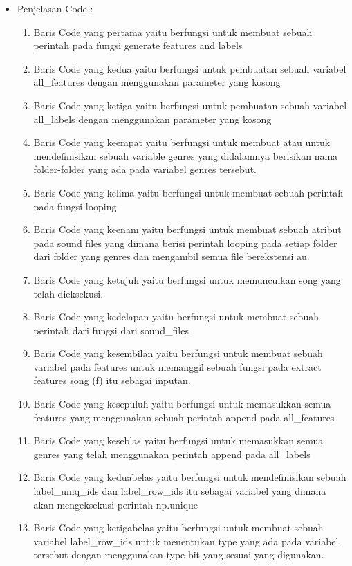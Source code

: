 \begin{enumerate}
\begin{itemize}
\par
\par
\item Penjelasan Code :
\begin{enumerate}
\item Baris Code yang pertama yaitu berfungsi untuk membuat sebuah perintah pada fungsi generate features and labels
\item Baris Code yang kedua yaitu berfungsi untuk pembuatan sebuah variabel all\_features dengan menggunakan parameter yang kosong
\item Baris Code yang ketiga yaitu berfungsi untuk pembuatan sebuah variabel all\_labels dengan menggunakan parameter yang kosong
\item Baris Code yang keempat yaitu berfungsi untuk membuat atau untuk mendefinisikan sebuah variable genres yang didalamnya berisikan nama folder-folder yang ada pada variabel genres tersebut.
\item Baris Code yang kelima yaitu berfungsi untuk membuat sebuah perintah pada fungsi looping
\item Baris Code yang keenam yaitu berfungsi untuk membuat sebuah atribut pada sound files yang dimana berisi perintah looping pada setiap folder dari folder yang genres dan mengambil semua file berekstensi au.
\item Baris Code yang ketujuh yaitu berfungsi untuk memunculkan song yang telah dieksekusi.
\item Baris Code yang kedelapan yaitu berfungsi untuk membuat sebuah perintah dari fungsi dari sound\_files
\item Baris Code yang kesembilan yaitu berfungsi untuk membuat sebuah variabel pada features untuk memanggil sebuah fungsi pada extract features song (f) itu sebagai inputan.
\item Baris Code yang kesepuluh yaitu berfungsi untuk memasukkan semua features yang menggunakan sebuah perintah append pada all\_features
\item Baris Code yang keseblas yaitu berfungsi untuk memasukkan semua genres yang telah menggunakan perintah append pada all\_labels
\item Baris Code yang keduabelas yaitu berfungsi untuk mendefinisikan sebuah label\_uniq\_ids dan label\_row\_ids itu sebagai variabel yang dimana akan mengeksekusi perintah np.unique
\item Baris Code yang ketigabelas yaitu berfungsi untuk membuat sebuah variabel label\_row\_ids untuk menentukan type yang ada pada variabel tersebut dengan menggunakan type bit yang sesuai yang digunakan.

\end{enumerate}
\end{itemize}
\end{enumerate}
